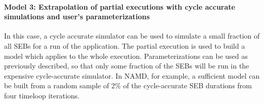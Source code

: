 \paragraph{Model 3: Extrapolation of partial executions with cycle accurate simulations 
and user's parameterizations}

In this case, a cycle accurate simulator can be used to simulate a small fraction of all SEBs for a run
 of the application. The partial execution is used to build a model which applies to the whole execution.
Parameterizations can be used as 
previously described,
so that only some fraction of the SEBs will be run in the expensive cycle-accurate simulator. 
In NAMD, for example, a sufficient model can be built from  a random sample of 2\% of the cycle-accurate SEB durations from four timeloop iterations. 
